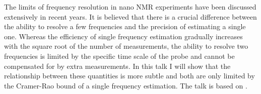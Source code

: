 The limits of frequency resolution in nano NMR experiments have been discussed extensively in recent years. It is believed that there is a crucial difference between the ability to resolve a few frequencies and the precision
of estimating a single one. Whereas the efficiency of single frequency estimation gradually increases with the square root of the number of measurements, the ability to resolve two frequencies is limited by the specific time scale of the probe and cannot be compensated for by extra measurements. In this talk I will show  that the relationship between these quantities is more subtle and both are only limited by the Cramer-Rao bound of a single frequency estimation. The talk is based on \cite{Schmitt_2017,1707.01902v1}.